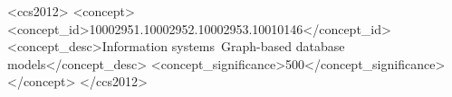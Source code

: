 \documentclass[sigconf,authordraft]{acmart}
\begin{document}
\begin{abstract}
%
\end{abstract}

\begin{CCSXML}
<ccs2012>
   <concept>
       <concept_id>10002951.10002952.10002953.10010146</concept_id>
       <concept_desc>Information systems~Graph-based database models</concept_desc>
       <concept_significance>500</concept_significance>
       </concept>
 </ccs2012>
\end{CCSXML}


%
\end{document}
